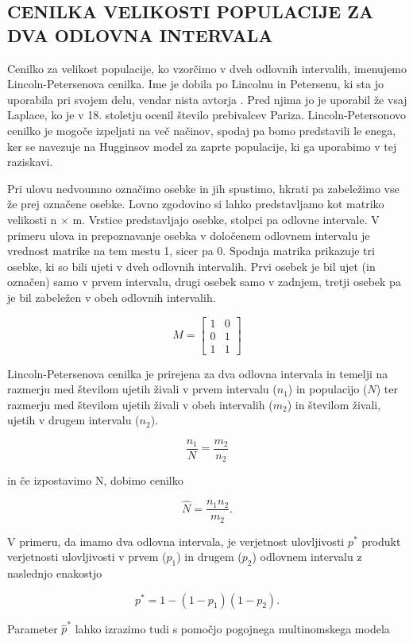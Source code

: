 \subsection{CENILKA VELIKOSTI POPULACIJE ZA DVA ODLOVNA INTERVALA}
Cenilko za velikost populacije, ko vzorčimo v dveh odlovnih intervalih, imenujemo Lincoln-Petersenova cenilka. Ime je dobila po Lincolnu in Petersenu, ki sta jo uporabila pri svojem delu, vendar nista avtorja \citep{williams_analysis_2002}. Pred njima jo je uporabil že vsaj Laplace, ko je v 18. stoletju ocenil število prebivalcev Pariza. Lincoln-Petersonovo cenilko je mogoče izpeljati na več načinov, spodaj pa bomo predstavili le enega, ker se navezuje na Hugginsov model za zaprte populacije, ki ga uporabimo v tej raziskavi.

Pri ulovu nedvoumno označimo osebke in jih spustimo, hkrati pa zabeležimo vse že prej označene osebke. Lovno zgodovino si lahko predstavljamo kot matriko velikosti n $\times$ m. Vrstice predstavljajo osebke, stolpci pa odlovne intervale. V primeru ulova in prepoznavanje osebka v določenem odlovnem intervalu je vrednost matrike na tem mestu 1, sicer pa 0. Spodnja matrika prikazuje tri osebke, ki so bili ujeti v dveh odlovnih intervalih. Prvi osebek je bil ujet (in označen) samo v prvem intervalu, drugi osebek samo v zadnjem, tretji osebek pa je bil zabeležen v obeh odlovnih intervalih.

\[
M = \begin{bmatrix}
1&0\\
0 & 1 \\
1 & 1
\end{bmatrix}
\]

Lincoln-Petersenova cenilka \citep{williams_analysis_2002} je prirejena za dva odlovna intervala in temelji na razmerju med številom ujetih živali v prvem intervalu ($n_1$) in populacijo ($N$) ter razmerju med številom ujetih živali v obeh intervalih ($m_2$) in številom živali, ujetih v drugem intervalu ($n_2$).

\[
\frac{n_1}{N} = \frac{m_2}{n_2}
\]

in če izpostavimo N, dobimo cenilko

\[
\hat{N} = \frac{n_1 n_2}{m_2}.
\]

V primeru, da imamo dva odlovna intervala, je verjetnost ulovljivosti $p^{*}$ produkt verjetnosti ulovljivosti v prvem ($p_1$) in drugem ($p_2$) odlovnem intervalu z naslednjo enakostjo

\[
p^* = 1 - (1-p_1)(1-p_2).
\]

Parameter $\hat{p}^{*}$ lahko izrazimo tudi s pomočjo pogojnega multinomskega modela

